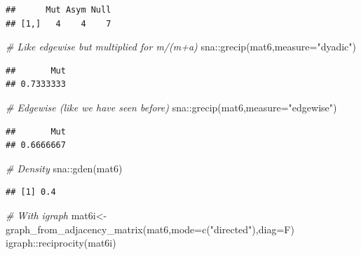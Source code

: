 \documentclass[
  notitlepage,
  onecolumn,
  openany]{book}
\newenvironment{Shaded}{\begin{snugshade}}{\end{snugshade}}
\newcommand{\AttributeTok}[1]{\textcolor[rgb]{0.77,0.63,0.00}{#1}}
\newcommand{\CommentTok}[1]{\textcolor[rgb]{0.56,0.35,0.01}{\textit{#1}}}
\newcommand{\FunctionTok}[1]{\textcolor[rgb]{0.00,0.00,0.00}{#1}}
\newcommand{\NormalTok}[1]{#1}
\newcommand{\OtherTok}[1]{\textcolor[rgb]{0.56,0.35,0.01}{#1}}
\newcommand{\SpecialCharTok}[1]{\textcolor[rgb]{0.00,0.00,0.00}{#1}}
\newcommand{\StringTok}[1]{\textcolor[rgb]{0.31,0.60,0.02}{#1}}
\begin{document}
\begin{verbatim}
##      Mut Asym Null
## [1,]   4    4    7
\end{verbatim}

\begin{Shaded}
\begin{Highlighting}[]
\CommentTok{\# Like edgewise but multiplied for m/(m+a)}
\NormalTok{sna}\SpecialCharTok{::}\FunctionTok{grecip}\NormalTok{(mat6,}\AttributeTok{measure=}\StringTok{"dyadic"}\NormalTok{)}
\end{Highlighting}
\end{Shaded}

\begin{verbatim}
##       Mut 
## 0.7333333
\end{verbatim}

\begin{Shaded}
\begin{Highlighting}[]
\CommentTok{\# Edgewise (like we have seen before)}
\NormalTok{sna}\SpecialCharTok{::}\FunctionTok{grecip}\NormalTok{(mat6,}\AttributeTok{measure=}\StringTok{"edgewise"}\NormalTok{)}
\end{Highlighting}
\end{Shaded}

\begin{verbatim}
##       Mut 
## 0.6666667
\end{verbatim}

\begin{Shaded}
\begin{Highlighting}[]
\CommentTok{\# Density}
\NormalTok{sna}\SpecialCharTok{::}\FunctionTok{gden}\NormalTok{(mat6)}
\end{Highlighting}
\end{Shaded}

\begin{verbatim}
## [1] 0.4
\end{verbatim}

\begin{Shaded}
\begin{Highlighting}[]
\CommentTok{\# With igraph}
\NormalTok{mat6i}\OtherTok{\textless{}{-}}\FunctionTok{graph\_from\_adjacency\_matrix}\NormalTok{(mat6,}\AttributeTok{mode=}\FunctionTok{c}\NormalTok{(}\StringTok{"directed"}\NormalTok{),}\AttributeTok{diag=}\NormalTok{F)}
\NormalTok{igraph}\SpecialCharTok{::}\FunctionTok{reciprocity}\NormalTok{(mat6i)}
\end{Highlighting}
\end{Shaded}
\end{document}
